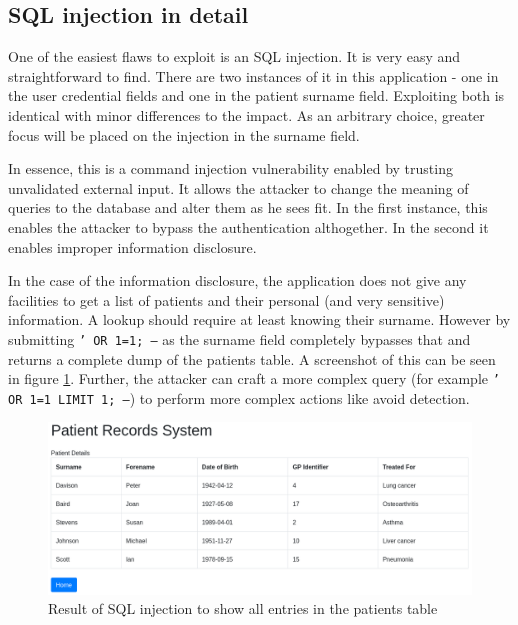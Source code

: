 \documentclass[10pt]{article}
\begin{document}
        \subsection{SQL injection in detail}

            One of the easiest flaws to exploit is an SQL injection. It is very
            easy and straightforward to find. There are two instances of it in
            this application - one in the user credential fields and one in the
            patient surname field. Exploiting both is identical with minor
            differences to the impact. As an arbitrary choice, greater focus
            will be placed on the injection in the surname field.

            In essence, this is a command injection vulnerability enabled by
            trusting unvalidated external input. It allows the attacker to
            change the meaning of queries to the database and alter them as he
            sees fit. In the first instance, this enables the attacker to
            bypass the authentication althogether. In the second it enables
            improper information disclosure.

            In the case of the information disclosure, the application does not
            give any facilities to get a list of patients and their personal
            (and very sensitive) information. A lookup should require at least
            knowing their surname. However by submitting \texttt{' OR 1=1; --}
            as the surname field completely bypasses that and returns a
            complete dump of the patients table. A screenshot of this can be
            seen in figure \ref{injection}. Further, the attacker can craft a
            more complex query (for example \texttt{' OR 1=1 LIMIT 1; --}) to
            perform more complex actions like avoid detection.

            \begin{figure}[h!]
                \includegraphics[width=\textwidth]{injection}
                \caption{Result of SQL injection to show all entries in the patients table}
                \label{injection}
            \end{figure}
\end{document}
